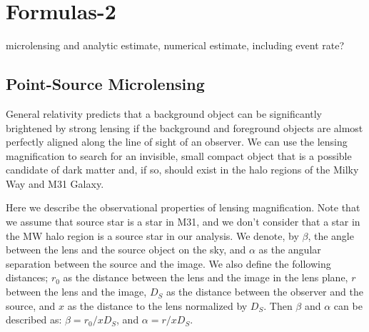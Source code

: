 \documentclass[iop, apj]{emulateapj}
\newcommand{\?}{\stackrel{?}{=}}
\begin{document}

\section{Formulas-2}
\label{sec:pointlens}
microlensing and analytic estimate, numerical estimate, including event rate?
\subsection{Point-Source Microlensing}
General relativity predicts that a background object can be significantly brightened by strong lensing if the background and foreground objects are almost perfectly aligned along the line of sight of an observer. We can use the lensing magnification to search for an invisible, small compact object that is a possible candidate of dark matter and, if so, should exist in the halo regions of the Milky Way and M31 Galaxy. 

Here we describe the observational properties of lensing magnification. Note that we assume that source star is a star in M31, and we don't consider that a star in the MW halo region is a source star in our analysis. 
We denote, by $\beta$, the angle between the lens and the source object on the sky, and 
$\alpha$ as the angular separation between the source and the image.
We also define the following distances; 
$r_0$ as the distance between the lens and the image in the lens plane,
$r$ between the lens and the image, 
$D_S$ as the distance between the observer and the source, and 
$x$ as the distance to the lens normalized by $D_S$. 
Then $\beta$ and $\alpha$ can be described as:
$\beta={r_0}/{x{D_S}}$, and $\alpha={r}/{x{D_S}}$. 
\end{document}
